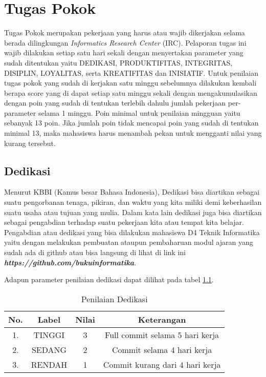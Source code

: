 \chapter{Tugas Pokok}

Tugas Pokok merupakan pekerjaan yang harus atau wajib dikerjakan selama berada dilingkungan \textit{Informatics Research Center} (IRC). Pelaporan tugas ini wajib dilakukan setiap satu hari sekali dengan menyertakan parameter yang sudah ditentukan yaitu DEDIKASI, PRODUKTIFITAS, INTEGRITAS, DISIPLIN, LOYALITAS, serta KREATIFITAS dan INISIATIF. Untuk penilaian tugas pokok yang sudah di kerjakan satu minggu sebelumnya dilakukan kembali berapa score yang di dapat setiap satu minggu sekali dengan mengakumulasikan dengan poin yang sudah di tentukan terlebih dahulu jumlah pekerjaan per-parameter selama 1 minggu. Poin minimal untuk penilaian mingguan yaitu sebanyak 13 poin. Jika jumlah poin tidak mencapai poin yang sudah di tentukan minimal 13, maka mahasiswa harus menambah pekan untuk mengganti nilai yang kurang tersebut.

\section{Dedikasi}

Menurut KBBI (Kamus besar Bahasa Indonesia), Dedikasi bisa diartikan sebagai suatu pengorbanan tenaga, pikiran, dan waktu yang kita miliki demi keberhasilan suatu usaha atau tujuan yang mulia. Dalam kata lain dedikasi juga bisa diartikan sebagai pengabdian terhadap suatu pekerjaan kita atau tempat kita belajar. Pengabdian atau dedikasi yang bisa dilakukan mahasiswa D4 Teknik Informatika yaitu dengan melakukan pembuatan ataupun pembaharuan modul ajaran yang sudah ada di github atau bisa langsung di lihat di link ini \textbf{\textit{https://github.com/bukuinformatika}}.

Adapun parameter penilaian dedikasi dapat dilihat pada tabel \ref{table:nilaidedikasi}.

\begin{table}[H]
\caption{Penilaian Dedikasi}
\centering
\begin{tabular}{|c|c|c|c|}
\hline
\textbf{No.}&\textbf{Label}&\textbf{Nilai}&\textbf{Keterangan}\\
\hline
1.&TINGGI&3&Full commit selama 5 hari kerja\\
\hline
2.&SEDANG&2&Commit selama 4 hari kerja\\
\hline
3.&RENDAH&1&Commit kurang dari 4 hari kerja\\
\hline
\end{tabular}
\label{table:nilaidedikasi}
\end{table}

